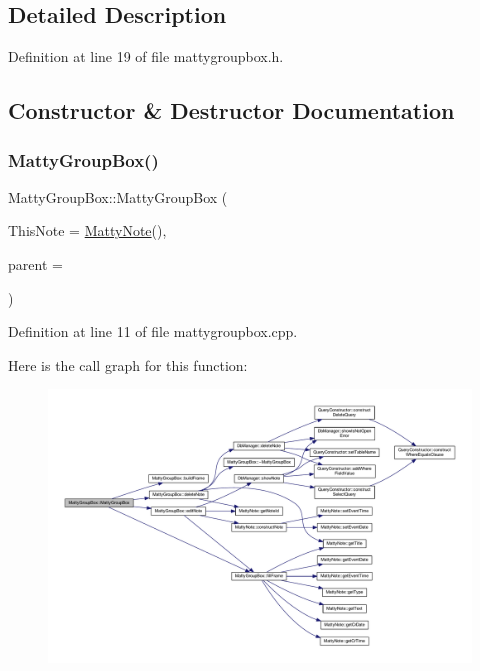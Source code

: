 \subsection{Detailed Description}


Definition at line 19 of file mattygroupbox.\+h.



\subsection{Constructor \& Destructor Documentation}
\hypertarget{classMattyGroupBox_a3445932bd0e2d39d640cc9457580c39e}{}\label{classMattyGroupBox_a3445932bd0e2d39d640cc9457580c39e} 
\subsubsection{\texorpdfstring{Matty\+Group\+Box()}{MattyGroupBox()}}
{\footnotesize\ttfamily Matty\+Group\+Box\+::\+Matty\+Group\+Box (\begin{DoxyParamCaption}\item[{const class \hyperlink{classMattyNote}{Matty\+Note} \&}]{This\+Note = {\ttfamily \hyperlink{classMattyNote}{Matty\+Note}()},  }\item[{Q\+Widget $\ast$}]{parent = {} }\end{DoxyParamCaption})}



Definition at line 11 of file mattygroupbox.\+cpp.

Here is the call graph for this function\+:
\nopagebreak
\begin{figure}[H]
\begin{center}
\leavevmode
\includegraphics[width=350pt]{classMattyGroupBox_a3445932bd0e2d39d640cc9457580c39e_cgraph}
\end{center}
\end{figure}
\hypertarget{classMattyGroupBox_acf5f5023cf210a83e9846a35b149dd70}{}\label{classMattyGroupBox_acf5f5023cf210a83e9846a35b149dd70} 
